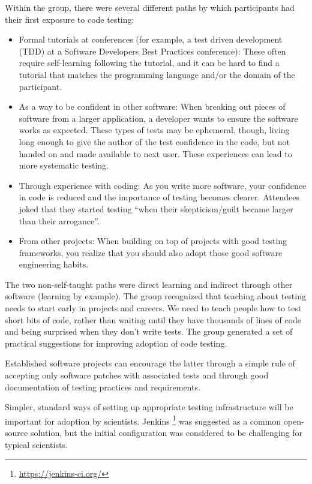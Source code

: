 \documentclass[11pt, oneside]{amsart}
\begin{document}
Within the group, there were several different paths by which participants had their 
first exposure to code testing:
\begin{itemize}

\item Formal tutorials at conferences (for example, a test driven development
(TDD) at a Software Developers Best Practices conference): These often require
self-learning following the tutorial, and it can be hard to find a tutorial that
matches the programming language and/or the domain of the participant.

\item As a way to be confident in other software: When breaking out pieces of
software from a larger application, a developer wants to ensure the software
works as expected. These types of tests may be ephemeral, though, living long
enough to give the author of the test confidence in the code, but not handed on
and made available to next user. These experiences can lead to more systematic
testing.

\item Through experience with coding: As you write more software, your
confidence in code is reduced and the importance of testing becomes clearer.
Attendees joked that they started testing ``when their skepticism/guilt became
larger than their arrogance''.

\item From other projects: When building on top of projects with good testing
frameworks, you realize that you should also adopt those good software
engineering habits.

\end{itemize}

The two non-self-taught paths were direct learning and indirect through other
software (learning by example). The group recognized that teaching about testing
needs to start early in projects and careers. We need to teach people how to
test short bits of code, rather than waiting until they have thousands of lines
of code and being surprised when they don't write tests. The group generated a
set of practical suggestions for improving adoption of code testing.

Established software projects can encourage the latter through a simple rule of
accepting only software patches with associated tests and through good
documentation of testing practices and requirements.

Simpler, standard ways of setting up appropriate testing infrastructure will be
important for adoption by scientists. Jenkins
\footnote{\url{https://jenkins-ci.org/}} was suggested as a common open-source
solution, but the initial configuration was considered to be challenging for
typical scientists.
\end{document}

